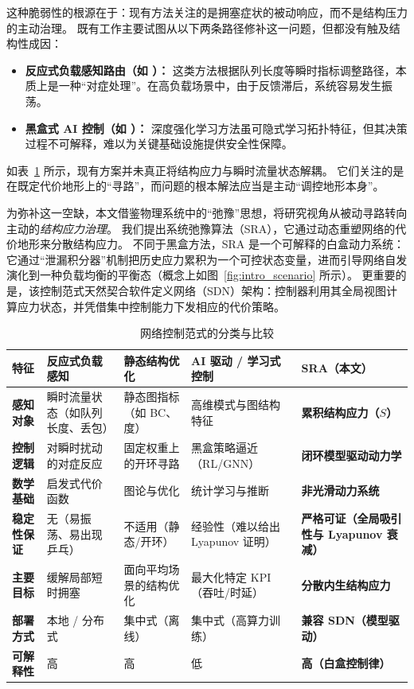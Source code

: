 \documentclass[journal]{IEEEtran}
\theoremstyle{plain}
\theoremstyle{definition}
\begin{document}
这种脆弱性的根源在于：现有方法关注的是拥塞症状的被动响应，而不是结构压力的主动治理。
既有工作主要试图从以下两条路径修补这一问题，但都没有触及结构性成因：
\begin{itemize}
    \item \textbf{反应式负载感知路由（如 \cite{Macabale2020Cradle}）：} 这类方法根据队列长度等瞬时指标调整路径，本质上是一种“对症处理”。在高负载场景中，由于反馈滞后，系统容易发生振荡。
    \item \textbf{黑盒式 AI 控制（如 \cite{Wei2023GRLPS}）：} 深度强化学习方法虽可隐式学习拓扑特征，但其决策过程不可解释，难以为关键基础设施提供安全性保障。
\end{itemize}

如表~\ref{tab:related_work_comparison} 所示，现有方案并未真正将结构应力与瞬时流量状态解耦。
它们关注的是在既定代价地形上的“寻路”，而问题的根本解法应当是主动“调控地形本身”。

为弥补这一空缺，本文借鉴物理系统中的“弛豫”思想，将研究视角从被动寻路转向主动的\textit{结构应力治理}。
我们提出系统弛豫算法（SRA），它通过动态重塑网络的代价地形来分散结构应力。
不同于黑盒方法，SRA 是一个可解释的白盒动力系统：它通过“泄漏积分器”机制把历史应力累积为一个可控状态变量，进而引导网络自发演化到一种负载均衡的平衡态（概念上如图~\ref{fig:intro_scenario} 所示）。
更重要的是，该控制范式天然契合软件定义网络（SDN）架构：控制器利用其全局视图计算应力状态，并凭借集中控制能力下发相应的代价策略。

\begin{table}[h!]
\centering
\caption{网络控制范式的分类与比较}
\label{tab:related_work_comparison}
\renewcommand{\arraystretch}{1.3}
\small
\begin{tabularx}{\textwidth}{|l|X|X|X|X|}
\hline
\textbf{特征} & \textbf{反应式负载感知} & \textbf{静态结构优化} & \textbf{AI 驱动 / 学习式控制} & \textbf{SRA（本文）} \\
\hline \hline
\textbf{感知对象} & 瞬时流量状态（如队列长度、丢包） & 静态图指标（如 BC、度） & 高维模式与图结构特征 & \textbf{累积结构应力（$S$）} \\
\hline
\textbf{控制逻辑} & 对瞬时扰动的对症反应 & 固定权重上的开环寻路 & 黑盒策略逼近（RL/GNN） & \textbf{闭环模型驱动动力学} \\
\hline
\textbf{数学基础} & 启发式代价函数 & 图论与优化 & 统计学习与推断 & \textbf{非光滑动力系统} \\
\hline
\textbf{稳定性保证} & 无（易振荡、易出现乒乓） & 不适用（静态/开环） & 经验性（难以给出 Lyapunov 证明） & \textbf{严格可证（全局吸引性与 Lyapunov 衰减）} \\
\hline
\textbf{主要目标} & 缓解局部短时拥塞 & 面向平均场景的结构优化 & 最大化特定 KPI（吞吐/时延） & \textbf{分散内生结构应力} \\
\hline
\textbf{部署方式} & 本地 / 分布式 & 集中式（离线） & 集中式（高算力训练） & \textbf{兼容 SDN（模型驱动）} \\
\hline
\textbf{可解释性} & 高 & 高 & 低 & \textbf{高（白盒控制律）} \\
\hline
\end{tabularx}
\end{table}
\end{document}

